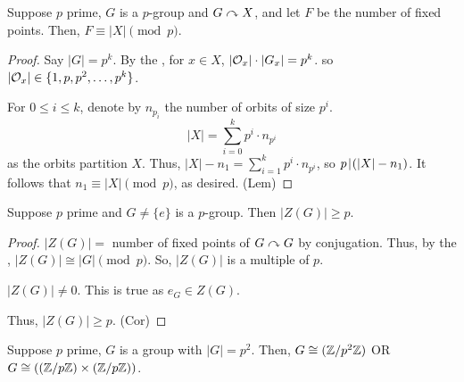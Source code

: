\documentclass[notes.tex]{subfiles}
\begin{document}
\begin{theorem}
\label{FPL}
	Suppose $p$ prime, $G$ is a $p$-group and $G\curvearrowright X$, and let $F$ be the number of fixed points. Then, $F \equiv |X| \pmod p$.
\end{theorem}
\begin{proof}
	Say $|G| = p^k$.
	By the , for $x\in X$, $|\mathcal{O}_x|\cdot|G_x| = p^k$.
	so $|\mathcal{O}_x| \in \{1, p, p^2, \ldots, p^k\}$.

	For $0 \le i \le k$, denote by $n_{p_i}$  the number of orbits of size $p^i$.
	\[
		|X| = \sum_{i=0}^k p^i\cdot n_{p^i}
	\] as the orbits partition $X$. %
	Thus, $|X| - n_1 = \sum_{i=1}^k p^i\cdot n_{p^i}$, so $p\mkern2mu|\mkern1mu (|X| - n_1)$. It follows that $n_1\equiv |X|\pmod p$, as desired. \qedhere(Lem)
\end{proof}

\begin{corollary}
	Suppose $p$ prime and $G\ne\{e\}$ is a $p$-group. Then $|Z(G)|\ge p$.
\end{corollary}
\begin{proof}
	$|Z(G)| = $ number of fixed points of $G\curvearrowright G$ by conjugation. Thus, by the , $|Z(G)|\cong |G| \pmod p$. So, $|Z(G)|$ is a multiple of $p$.

	\begin{claim}
		$|Z(G)| \ne 0$. This is true as $e_G\in Z(G)$.
	\end{claim}
	Thus, $|Z(G)|\ge p$. \qedhere(Cor)
\end{proof}

\begin{proposition}
	Suppose $p$ prime, $G$ is a group with $|G| = p^2$.
	Then, $G\cong (\mathbb{Z}/{p^2}\mathbb{Z})$ OR $G\cong ((\mathbb{Z}/{p}\mathbb{Z})\times (\mathbb{Z}/{p}\mathbb{Z}))$.
\end{proposition}
\end{document}
